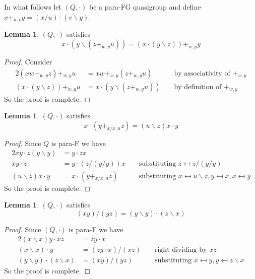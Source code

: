 \documentclass[12pt, twoside, openright]{report}
\theoremstyle{definition}
\newtheorem{lem}[thm]{Lemma}
\newcommand{\ldv}{\backslash}       %
\newcommand{\rdv}{/}                %
\begin{document}
In what follows let $(Q, \cdot)$ be a para-FG quasigroup and define
  $x +_{u, v} y = (x\rdv u) \cdot (v\ldv y)$.

\begin{lem}\label{lem-30}
  $(Q, \cdot)$ satisfies
  \[x\cdot (y\ldv (z +_{w, y} u)) = (x\cdot (y\ldv z)) +_{w, y} y\]
\end{lem}

\begin{proof}
  Consider
  \begin{alignat*}{2}
    (xw +_{w, y} z) +_{w, y} u &= xw +_{w, y} (z +_{w, y} u) &&\text{ by associativity of $+_{w, y}$}\\
    (x\cdot (y\ldv z)) +_{w, y} u &= x\cdot (y\ldv (z +_{w, y} u)) &&\text{ by definition of $+_{w, y}$}
  \end{alignat*}
  So the proof is complete.
\end{proof}

\begin{lem}\label{lem-33ii}
  $(Q, \cdot)$ satisfies
  \[x\cdot (y +_{x\rdv x, u} z) = (u\ldv z)x\cdot y\]
\end{lem}

\begin{proof}
  Since $Q$ is para-F we have
  \begin{alignat*}{2}
    xy\cdot z(y\ldv y) &= y\cdot zx\\
    xy\cdot z &= y\cdot (z\rdv(y\rdv y))x &&\text{ substituting $z\mapsfrom z\rdv(y\rdv y)$}\\
    (u\ldv z)x\cdot y &= x\cdot (y +_{x\rdv x, u} z) &&\text{ substituting
      $x\mapsfrom u\ldv z, y\mapsfrom x, x\mapsfrom y$}
  \end{alignat*}
  So the proof is complete.
\end{proof}

\begin{lem}\label{lem-34ii}
  $(Q, \cdot)$ satisfies
  \[(xy)\rdv (yz) = (y\ldv y)\cdot (z\ldv x)\]
\end{lem}

\begin{proof}
  Since $(Q, \cdot)$ is para-F we have
  \begin{alignat*}{2}
    (x\ldv x)y\cdot xz &= zy\cdot x &&\\
    (x\ldv x)\cdot y &= (zy\cdot x)\rdv (xz) &&\text{ right dividing by $xz$}\\
    (y\ldv y)\cdot (z\ldv x) &= (xy)\rdv(yz) &&\text{ substituting
      $x\mapsfrom y, y\mapsfrom z\ldv x$}
  \end{alignat*}
  So the proof is complete.
\end{proof}
\end{document}
